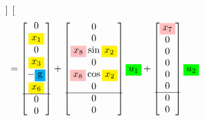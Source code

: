 \documentclass[12pt]{article}
\begin{document}
\begin{align*}
\begin{bmatrix}
    \end{bmatrix} \\
    &= \begin{bmatrix}
        0 \\
        \colorbox{yellow}{$x_1$} \\
        0 \\
        \colorbox{yellow}{$x_3$} \\
        -\colorbox{cyan}{g} \\
        \colorbox{yellow}{$x_6$} \\
        \hline
        0 \\
        0 \\
        \end{bmatrix} + \begin{bmatrix}
        0 \\
        0 \\
        \colorbox{pink}{$x_8$} \sin{\colorbox{yellow}{$x_2$}} \\
        0 \\
        \colorbox{pink}{$x_8$} \cos{\colorbox{yellow}{$x_2$}} \\
        0 \\
        \hline
        0 \\
        0 \\
    \end{bmatrix} \colorbox{green}{$u_1$} + \begin{bmatrix}
        \colorbox{pink}{$x_7$} \\
        0 \\
        0 \\
        0 \\
        0 \\
        0 \\
        \hline
        0 \\
        0 \\
    \end{bmatrix} \colorbox{green}{$u_2$} \\    

\end{align*}
\end{document}

